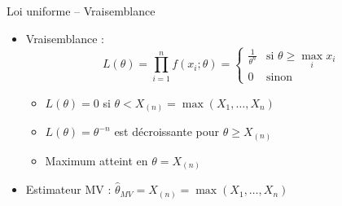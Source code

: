 \documentclass[11pt,aspectratio=169]{beamer}
\begin{document}
\begin{frame}{Loi uniforme -- Vraisemblance}

\begin{itemize}

\item Vraisemblance :\newline
  \[
  L(\theta) = \prod_{i=1}^n f(x_i; \theta) = \begin{cases}
  \frac{1}{\theta^n} & \text{si } \theta \geq \max_i x_i \\[0.3em]
  0 & \text{sinon}
  \end{cases}
  \]

  \begin{itemize}
    \item $L(\theta) = 0$ si $\theta < X_{(n)} = \max(X_1, \ldots, X_n)$\newline
    \item $L(\theta) = \theta^{-n}$ est décroissante pour $\theta \geq X_{(n)}$\newline
    \item Maximum atteint en $\theta = X_{(n)}$\newline
  \end{itemize}

\item Estimateur MV : $\boxed{\hat{\theta}_{MV} = X_{(n)} = \max(X_1, \ldots, X_n)}$

\end{itemize}

\end{frame}
\end{document}

